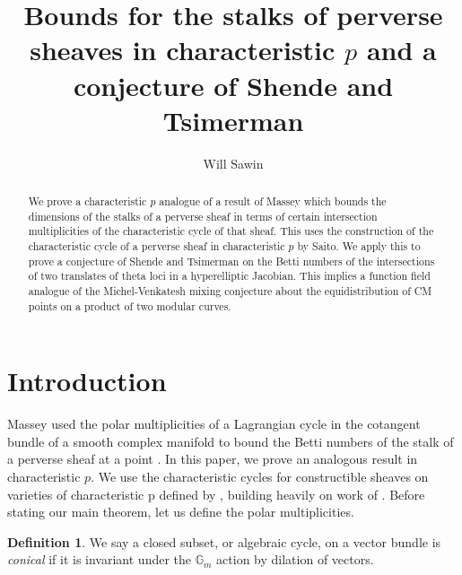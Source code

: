 \documentclass[12pt]{amsart}
\theoremstyle{definition}
\newtheorem{defi}[theorem]{Definition}
\theoremstyle{remark}
\begin{document}
\title[Bounds for the stalks of perverse sheaves]{Bounds for the stalks of perverse sheaves in characteristic $p$ and a conjecture of Shende and Tsimerman }
\author{Will Sawin}
\address{Department of Mathematics \\ Columbia University \\ New York, NY 10027}

\maketitle

\vspace{15pt}

\begin{abstract} We prove a characteristic $p$ analogue of a result of Massey which bounds the dimensions of the stalks of a perverse sheaf in terms of certain intersection multiplicities of the characteristic cycle of that sheaf. This uses the construction of the characteristic cycle of a perverse sheaf in characteristic $p$ by Saito. We apply this to prove a conjecture of Shende and Tsimerman on the Betti numbers of the intersections of two translates of theta loci in a hyperelliptic Jacobian. This implies a function field analogue of the Michel-Venkatesh mixing conjecture about the equidistribution of CM points on a product of two modular curves. \end{abstract}

\section{Introduction}


Massey used the polar multiplicities of a Lagrangian cycle in the cotangent bundle of a smooth complex manifold to bound the Betti numbers of the stalk of a perverse sheaf at a point \cite[Corollary 5.5]{Massey}. In this paper, we prove an analogous result in characteristic $p$. We use the characteristic cycles for constructible sheaves on varieties of characteristic p defined by \citet[Definition 5.10]{saito1}, building heavily on work of \citet{Beilinson}. Before stating our main theorem, let us define the polar multiplicities. 

\begin{defi} We say a closed subset, or algebraic cycle, on a vector bundle is \emph{conical} if it is invariant under the $\mathbb G_m$ action by dilation of vectors. \end{defi}
\end{document}

